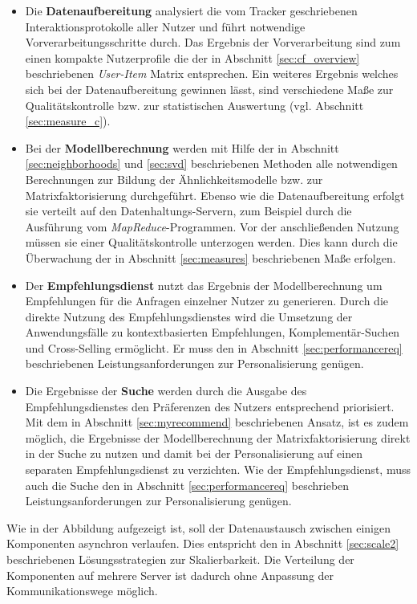 \begin{itemize}
\item Die \textbf{Datenaufbereitung} analysiert die vom Tracker geschriebenen Interaktionsprotokolle aller Nutzer und führt notwendige Vorverarbeitungsschritte durch. Das Ergebnis der Vorverarbeitung sind zum einen kompakte Nutzerprofile die der in Abschnitt \ref{sec:cf_overview} beschriebenen \textit{User-Item} Matrix entsprechen. Ein weiteres Ergebnis welches sich bei der Datenaufbereitung gewinnen lässt, sind verschiedene Maße zur Qualitätskontrolle bzw. zur statistischen Auswertung (vgl. Abschnitt \ref{sec:measure_c}).
\item Bei der \textbf{Modellberechnung} werden mit Hilfe der in Abschnitt \ref{sec:neighborhoods} und \ref{sec:svd} beschriebenen Methoden alle notwendigen Berechnungen zur Bildung der Ähnlichkeitsmodelle bzw. zur Matrixfaktorisierung durchgeführt. Ebenso wie die Datenaufbereitung erfolgt sie verteilt auf den Datenhaltungs-Servern, zum Beispiel durch die Ausführung vom \textit{MapReduce}-Programmen. Vor der anschließenden Nutzung müssen sie einer Qualitätskontrolle unterzogen werden. Dies kann durch die Überwachung der in Abschnitt \ref{sec:measures} beschriebenen Maße erfolgen.
\item Der \textbf{Empfehlungsdienst} nutzt das Ergebnis der Modellberechnung um Empfehlungen für die Anfragen einzelner Nutzer zu generieren. Durch die direkte Nutzung des Empfehlungsdienstes wird die Umsetzung der Anwendungsfälle zu kontextbasierten Empfehlungen, Komplementär-Suchen und Cross-Selling ermöglicht.  Er muss den in Abschnitt \ref{sec:performancereq} beschriebenen Leistungsanforderungen zur Personalisierung genügen.
\item Die Ergebnisse der \textbf{Suche} werden durch die Ausgabe des Empfehlungsdienstes den Präferenzen des Nutzers entsprechend priorisiert. Mit dem in Abschnitt \ref{sec:myrecommend} beschriebenen Ansatz, ist es zudem möglich, die Ergebnisse der Modellberechnung der Matrixfaktorisierung direkt in der Suche zu nutzen und damit bei der Personalisierung auf einen separaten Empfehlungsdienst zu verzichten. Wie der Empfehlungsdienst, muss auch die Suche den in Abschnitt \ref{sec:performancereq} beschrieben Leistungsanforderungen zur Personalisierung genügen.
\end{itemize}

Wie in der Abbildung aufgezeigt ist, soll der Datenaustausch zwischen einigen Komponenten asynchron verlaufen. Dies entspricht den in Abschnitt \ref{sec:scale2} beschriebenen Lösungsstrategien zur Skalierbarkeit. Die Verteilung der Komponenten auf mehrere Server ist dadurch ohne Anpassung der Kommunikationswege möglich.
%

